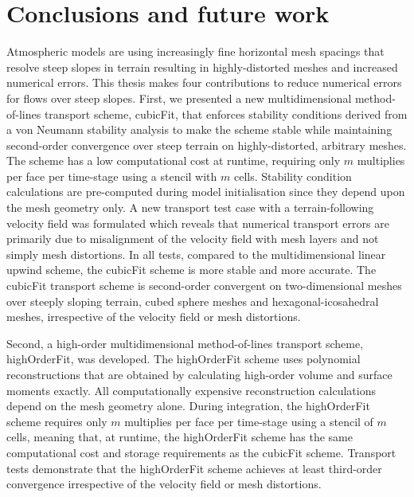 \chapter{Conclusions and future work}
\label{ch:discussion}

Atmospheric models are using increasingly fine horizontal mesh spacings that resolve steep slopes in terrain resulting in highly-distorted meshes and increased numerical errors.
This thesis makes four contributions to reduce numerical errors for flows over steep slopes.
First, we presented a new multidimensional method-of-lines transport scheme, cubicFit, that enforces stability conditions derived from a von Neumann stability analysis to make the scheme stable while maintaining second-order convergence over steep terrain on highly-distorted, arbitrary meshes.
The scheme has a low computational cost at runtime, requiring only $m$ multiplies per face per time-stage using a stencil with $m$ cells.
Stability condition calculations are pre-computed during model initialisation since they depend upon the mesh geometry only.
A new transport test case with a terrain-following velocity field was formulated which reveals that numerical transport errors are primarily due to misalignment of the velocity field with mesh layers and not simply mesh distortions.
In all tests, compared to the multidimensional linear upwind scheme, the cubicFit scheme is more stable and more accurate.
The cubicFit transport scheme is second-order convergent on two-dimensional meshes over steeply sloping terrain, cubed sphere meshes and hexagonal-icosahedral meshes, irrespective of the velocity field or mesh distortions.

Second, a high-order multidimensional method-of-lines transport scheme, highOrderFit, was developed.
The highOrderFit scheme uses \kexact{} polynomial reconstructions that are obtained by calculating high-order volume and surface moments exactly.
All computationally expensive reconstruction calculations depend on the mesh geometry alone.
During integration, the highOrderFit scheme requires only $m$ multiplies per face per time-stage using a stencil of $m$ cells, meaning that, at runtime, the highOrderFit scheme has the same computational cost and storage requirements as the cubicFit scheme.
Transport tests demonstrate that the highOrderFit scheme achieves at least third-order convergence irrespective of the velocity field or mesh distortions.

